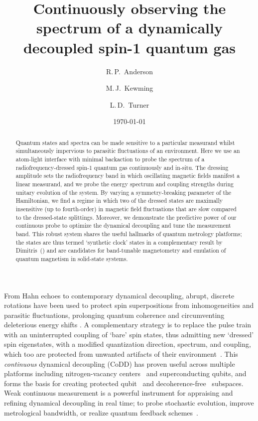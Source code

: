 \documentclass[aps,prl,reprint,superscriptaddress,floatfix]{revtex4-1}
\begin{document}
\title{Continuously observing the spectrum of a dynamically decoupled spin-1 quantum gas}

\author{R.\,P.~Anderson}
\author{M.\,J.~Kewming}
\author{L.\,D.~Turner}

\date{\today}

\begin{abstract}
Quantum states and spectra can be made sensitive to a particular measurand whilst simultaneously impervious to parasitic fluctuations of an environment.
Here we use an atom-light interface with minimal backaction to probe the spectrum of a radiofrequency-dressed spin-1 quantum gas continuously and in-situ.
The dressing amplitude sets the radiofrequency band in which oscillating magnetic fields manifest a linear measurand, and we probe the energy spectrum and coupling strengths during unitary evolution of the system.
By varying a symmetry-breaking parameter of the Hamiltonian, we find a regime in which two of the dressed states are maximally insensitive (up to fourth-order) in magnetic field fluctuations that are slow compared to the dressed-state splittings.
Moreover, we demonstrate the predictive power of our continuous probe to optimize the dynamical decoupling and tune the measurement band.
This robust system shares the useful hallmarks of quantum metrology platforms; the states are thus termed `synthetic clock' states in a complementary result by Dimitris~\etal (\dimitris) and are candidates for band-tunable magnetometry and emulation of quantum magnetism in solid-state systems. 
\end{abstract}

\maketitle

From Hahn echoes to contemporary dynamical decoupling, abrupt, discrete rotations have been used to protect spin superpositions from inhomogeneities and parasitic fluctuations, prolonging quantum coherence and circumventing deleterious energy shifts \cite{biercuk_optimized_2009,lange_universal_2010,bluhm_dephasing_2011}.
A complementary strategy is to replace the pulse train with an uninterrupted coupling of `bare' spin states, thus admitting new `dressed' spin eigenstates, with a modified quantization direction, spectrum, and coupling, which too are protected from unwanted artifacts of their environment~\cite{fanchini_continuously_2007}.
This \textit{continuous} dynamical decoupling (CoDD) has proven useful across multiple platforms including nitrogen-vacancy centers~\cite{hirose_continuous_2012,loretz_radio-frequency_2013,cai_robust_2012,*cai_long-lived_2012,golter_protecting_2014} and superconducting qubits, and forms the basis for creating protected qubit~\cite{aharon_general_2013} and decoherence-free~\cite{facchi_quantum_2002,*facchi_unification_2004} subspaces.
Weak continuous measurement is a powerful instrument for appraising and refining dynamical decoupling in real time; to probe stochastic evolution, improve metrological bandwidth, or realize quantum feedback schemes~\cite{vijay_stabilizing_2012}.
\end{document}
